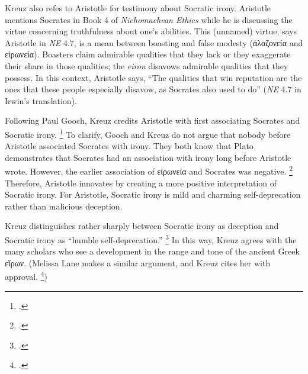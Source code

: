 \documentclass[12pt,letterpaper]{article}
\begin{document}
Kreuz also refes to Aristotle for testimony about Socratic irony.
Aristotle mentions Socrates in Book 4 of \textit{Nichomachean Ethics} while he is discussing the virtue concerning truthfulness about one's abilities.
This (unnamed) virtue, says Aristotle in \textit{NE} 4.7, is a mean between boasting and false modesty (\textgreek{ἀλαζονεία} and \textgreek{εἰρωνεία}).
Boasters claim admirable qualities that they lack or they exaggerate their share in those qualities; the \textit{eiron} disavows admirable qualities that they possess.
In this context, Aristotle says, ``The qualities that win reputation are the ones that these people especially disavow, as Socrates also used to do'' (\textit{NE} 4.7 in Irwin's translation).

Following Paul Gooch, Kreuz credits Aristotle with first associating Socrates and Socratic irony.
\footcites[][16]{kreuz-irony-and-sarcasm-2020}[][]{gooch-socratic-irony-and-arisotles-eiron-1987}
To clarify, Gooch and Kreuz do not argue that nobody before Aristotle associated Socrates with irony.
They both know that Plato demonstrates that Socrates had an association with irony long before Aristotle wrote.
However, the earlier association of \textgreek{εἰρωνεία} and Socrates was negative.
\footcite[][]{worlfsdorf-eironeia-aristophanes-plato-2008}
Therefore, Aristotle innovates by creating a more positive interpretation of Socratic irony.
For Aristotle, Socratic irony is mild and charming self-deprecation rather than malicious deception.

Kreuz distinguishes rather sharply between Socratic irony as deception and Socratic irony as ``humble self-deprecation.''
\footcite[][16]{kreuz-irony-and-sarcasm-2020}
In this way, Kreuz agrees with the many scholars who see a development in the range and tone of the ancient Greek \textgreek{εἴρων}.
(Melissa Lane makes a similar argument, and Kreuz cites her with approval.
\footcite[The reference in question is][]{lane-reconsidering-socratic-irony-2011})


\newpage
\pagestyle{references}
\printbibliography[filter=sources,title={Ancient Sources: Editions, Translations, Commentaries}]
\printbibliography[filter=secondary,title=Secondary Literature]
\end{document}
